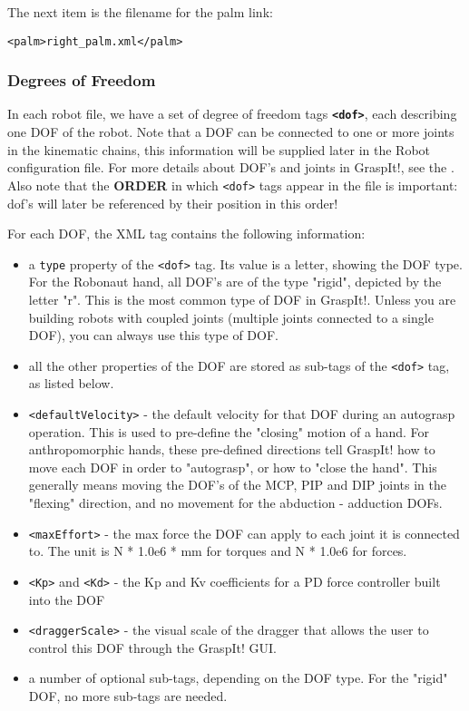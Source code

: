 The next item is the filename for the palm link:

\begin{verbatim}
<palm>right_palm.xml</palm>
\end{verbatim}

\subsubsection{Degrees of Freedom}

In each robot file, we have a set of degree of freedom tags
\texttt{\textbf{\texttt{<dof>}}}, each describing one DOF of the robot. Note
that a DOF can be connected to one or more joints in the kinematic
chains, this information will be supplied later in the Robot
configuration file. For more details about DOF's and joints in
GraspIt!, see the . Also note that the \textbf{ORDER} in which
\texttt{<dof>} tags appear in the file is important: dof's will later be
referenced by their position in this order!

For each DOF, the XML tag contains the following information:
\begin{itemize}
\item a \texttt{type} property of the \texttt{<dof>} tag. Its value is a
  letter, showing the DOF type. For the Robonaut hand, all DOF's are
  of the type "rigid", depicted by the letter "r". This is the most
  common type of DOF in GraspIt!. Unless you are building robots with
  coupled joints (multiple joints connected to a single DOF), you can
  always use this type of DOF.
\item all the other properties of the DOF are stored as sub-tags of
  the \texttt{<dof>} tag, as listed below.
\item \texttt{<defaultVelocity>} - the default velocity for that DOF during an
  autograsp operation. This is used to pre-define the "closing" motion
  of a hand. For anthropomorphic hands, these pre-defined directions
  tell GraspIt! how to move each DOF in order to "autograsp", or how
  to "close the hand". This generally means moving the DOF's of the
  MCP, PIP and DIP joints in the "flexing" direction, and no movement
  for the abduction - adduction DOFs.
\item \texttt{<maxEffort>} - the max force the DOF can apply to each joint it
  is connected to. The unit is N * 1.0e6 * mm for torques and N *
  1.0e6 for forces.
\item \texttt{<Kp>} and \texttt{<Kd>} - the Kp and Kv coefficients for a PD force
  controller built into the DOF
\item \texttt{<draggerScale>} - the visual scale of the dragger that allows the
  user to control this DOF through the GraspIt! GUI.
\item a number of optional sub-tags, depending on the DOF type. For
  the "rigid" DOF, no more sub-tags are needed.
\end{itemize}

